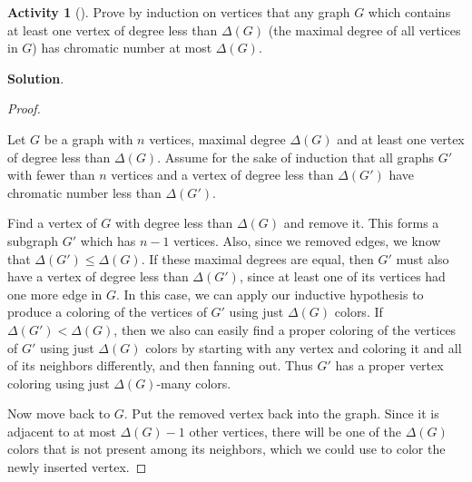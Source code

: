 \documentclass[10pt,]{book}
\theoremstyle{plain}
\theoremstyle{definition}
\theoremstyle{definition}
\theoremstyle{definition}
\newtheorem{activity}[project]{Activity}
\numberwithin{equation}{chapter}
\newcommand{\lt}{<}
\begin{document}
\begin{activity}[]\label{activity-39}
\hypertarget{p-396}{}%
Prove by induction on vertices that any graph \(G\) which contains at least one vertex of degree less than \(\Delta(G)\) (the maximal degree of all vertices in \(G\)) has chromatic number at most \(\Delta(G)\).%
\par\smallskip%
\noindent\textbf{Solution}.\hypertarget{solution-27}{}\quad%
\begin{proof}\hypertarget{proof-5}{}
\hypertarget{p-397}{}%
Let \(G\) be a graph with \(n\) vertices, maximal degree \(\Delta(G)\) and at least one vertex of degree less than \(\Delta(G)\). Assume for the sake of induction that all graphs \(G'\) with fewer than \(n\) vertices and a vertex of degree less than \(\Delta(G')\) have chromatic number less than \(\Delta(G')\).%
\par
\hypertarget{p-398}{}%
Find a vertex of \(G\) with degree less than \(\Delta(G)\) and remove it. This forms a subgraph \(G'\) which has \(n-1\) vertices. Also, since we removed edges, we know that \(\Delta(G') \le \Delta(G)\). If these maximal degrees are equal, then \(G'\) must also have a vertex of degree less than \(\Delta(G')\), since at least one of its vertices had one more edge in \(G\). In this case, we can apply our inductive hypothesis to produce a coloring of the vertices of \(G'\) using just \(\Delta(G)\) colors. If \(\Delta(G') \lt  \Delta(G)\), then we also can easily find a proper coloring of the vertices of \(G'\) using just \(\Delta(G)\) colors by starting with any vertex and coloring it and all of its neighbors differently, and then fanning out. Thus \(G'\) has a proper vertex coloring using just \(\Delta(G)\)-many colors.%
\par
\hypertarget{p-399}{}%
Now move back to \(G\). Put the removed vertex back into the graph. Since it is adjacent to at most \(\Delta(G) - 1\) other vertices, there will be one of the \(\Delta(G)\) colors that is not present among its neighbors, which we could use to color the newly inserted vertex.%
\end{proof}
\end{activity}
\typeout{************************************************}
\typeout{************************************************}
\end{document}

